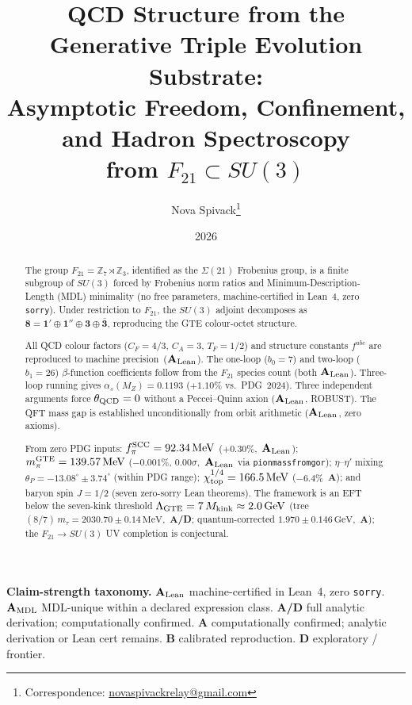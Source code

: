\documentclass[11pt]{article}
\title{\bfseries QCD Structure from the Generative Triple Evolution Substrate:\\[0.3em]
Asymptotic Freedom, Confinement, and Hadron Spectroscopy\\[0.2em]
from $F_{21} \subset SU(3)$}
\author[1]{Nova Spivack\thanks{Correspondence:
  \href{mailto:novaspivackrelay@gmail.com}{novaspivackrelay@gmail.com}}}
\affil[1]{Independent Research}
\date{2026}
\theoremstyle{remark}
\newcommand{\ZS}{\mathbb{Z}_7}
\newcommand{\ZZ}{\mathbb{Z}}
\newcommand{\Ftwentyone}{F_{21}}
\newcommand{\lean}[1]{%
  \penalty-100
  \begingroup\def\_{\textunderscore\allowbreak}\texttt{#1}\endgroup}
\newcommand{\CatA}{\textbf{A}}
\newcommand{\CatAL}{\ensuremath{\textbf{A}_{\rm Lean}}}
\newcommand{\CatAMDL}{\ensuremath{\textbf{A}_{\rm MDL}}}
\newcommand{\CatAD}{\textbf{A/D}}
\newcommand{\CatB}{\textbf{B}}
\newcommand{\CatD}{\textbf{D}}
\begin{document}
\maketitle
\NovaZenodoAfterTitle

\begin{abstract}
The group $\Ftwentyone = \ZS \rtimes \ZZ_3$, identified as the $\Sigma(21)$
Frobenius group, is a finite subgroup of $SU(3)$ forced by Frobenius norm ratios
and Minimum-Description-Length (MDL) minimality (no free parameters,
machine-certified in Lean~4, zero \texttt{sorry}). Under restriction to $\Ftwentyone$, the $SU(3)$ adjoint decomposes
as $\mathbf{8} = \mathbf{1}' \oplus \mathbf{1}'' \oplus \mathbf{3} \oplus
\bar{\mathbf{3}}$, reproducing the GTE colour-octet structure.

All QCD colour factors ($C_F = 4/3$, $C_A = 3$, $T_F = 1/2$) and structure
constants $f^{abc}$ are reproduced to machine precision~(\CatAL).
The one-loop ($b_0 = 7$) and two-loop ($b_1 = 26$) $\beta$-function coefficients
follow from the $\Ftwentyone$ species count (both \CatAL).
Three-loop running gives $\alpha_s(M_Z) = 0.1193$ ($+1.10\%$ vs.\ PDG~2024).
Three independent arguments force $\theta_{\rm QCD} = 0$ without a Peccei--Quinn
axion (\CatAL, ROBUST). The QFT mass gap is established unconditionally from
orbit arithmetic (\CatAL, zero axioms).

From zero PDG inputs: $f_\pi^{\rm SCC} = 92.34\,\text{MeV}$ ($+0.30\%$,~\CatAL);
$m_\pi^{\rm GTE} = 139.57\,\text{MeV}$ ($-0.001\%$, $0.00\sigma$,~\CatAL
via \lean{pion\_mass\_from\_gor});
$\eta$--$\eta'$ mixing $\theta_P = -13.08^\circ \pm 3.74^\circ$ (within PDG range);
$\chi_{\rm top}^{1/4} = 166.5\,\text{MeV}$ ($-6.4\%$~\CatA);
and baryon spin $J = 1/2$ (seven zero-sorry Lean theorems).
The framework is an EFT below the seven-kink threshold
$\Lambda_{\rm GTE} = 7\,M_{\rm kink} \approx 2.0\,\text{GeV}$
(tree $(8/7)\,m_\tau = 2030.70 \pm 0.14\,\text{MeV}$,~\CatAD{};
quantum-corrected $1.970 \pm 0.146\,\text{GeV}$,~\CatA{});
the $\Ftwentyone \to SU(3)$ UV completion is conjectural.
\end{abstract}

\tableofcontents

\vspace{6pt}
\noindent\textbf{Claim-strength taxonomy.}
\CatAL{} machine-certified in Lean~4, zero \texttt{sorry}.
\CatAMDL{} MDL-unique within a declared expression class.
\CatAD{} full analytic derivation; computationally confirmed.
\CatA{} computationally confirmed; analytic derivation or Lean cert remains.
\CatB{} calibrated reproduction.
\CatD{} exploratory / frontier.
\end{document}
